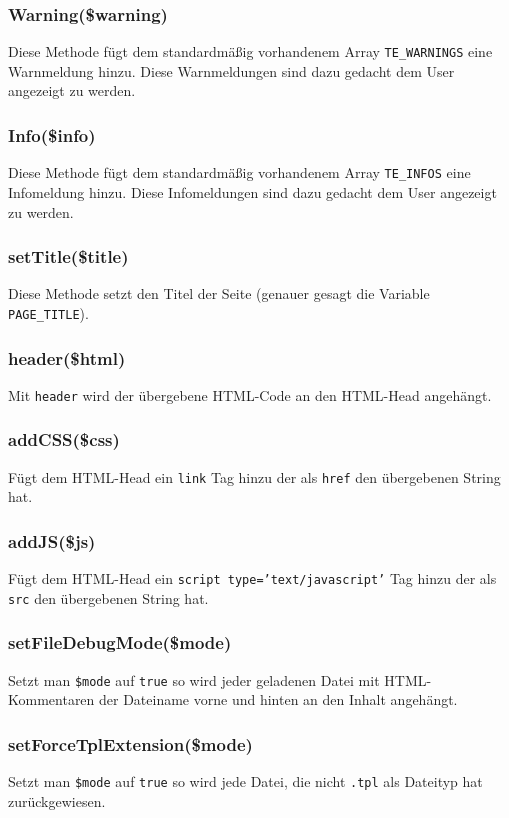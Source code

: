 \documentclass[a4paper,10pt]{article}
\begin{document}
\subsubsection{Warning(\$warning)}
Diese Methode f\"ugt dem standardm\"a\ss{}ig vorhandenem Array {\tt TE\_WARNINGS} eine Warnmeldung hinzu. Diese Warnmeldungen sind dazu gedacht dem User angezeigt zu werden.

\subsubsection{Info(\$info)}
Diese Methode f\"ugt dem standardm\"a\ss{}ig vorhandenem Array {\tt TE\_INFOS} eine Infomeldung hinzu. Diese Infomeldungen sind dazu gedacht dem User angezeigt zu werden.

\subsubsection{setTitle(\$title)}
Diese Methode setzt den Titel der Seite (genauer gesagt die Variable {\tt PAGE\_TITLE}).

\subsubsection{header(\$html)}
Mit {\tt header} wird der \"ubergebene HTML-Code an den HTML-Head angeh\"angt.

\subsubsection{addCSS(\$css)}
F\"ugt dem HTML-Head ein {\tt link} Tag hinzu der als {\tt href} den \"ubergebenen String hat.

\subsubsection{addJS(\$js)}
F\"ugt dem HTML-Head ein {\tt script type='text/javascript'} Tag hinzu der als {\tt src}
 den \"ubergebenen String hat.

\subsubsection{setFileDebugMode(\$mode)}
Setzt man {\tt \$mode} auf {\tt true} so wird jeder geladenen Datei mit HTML-Kommentaren
der Dateiname vorne und hinten an den Inhalt angeh\"angt.

\subsubsection{setForceTplExtension(\$mode)}
Setzt man {\tt \$mode} auf {\tt true} so wird jede Datei, die nicht {\tt .tpl} als Dateityp
 hat zur\"uckgewiesen.
\end{document}
